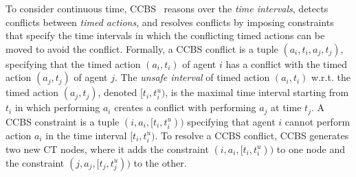 \documentclass[letterpaper]{article} %
\newcommand{\ccbs}{\ac{CCBS}\xspace}
\newcommand{\ct}{\ac{CT}\xspace}
\begin{document}
To consider continuous time, \ccbs~\cite{andreychuk2019multi} reasons over the \emph{time intervals}, 
detects conflicts between \emph{timed actions}, 
and resolves conflicts by imposing constraints that specify the time intervals in which the conflicting timed actions can be moved to avoid the conflict.  
Formally, a \ccbs conflict is a tuple $(a_i, t_i, a_j, t_j)$, specifying that the timed action $(a_i, t_i)$ of agent $i$ has a conflict with the timed action $(a_j, t_j)$ of agent $j$.  
The \emph{unsafe interval} of timed action $(a_i, t_i)$ w.r.t. the timed action $(a_j, t_j)$, denoted $[t_i, t_i^u)$, is the maximal time interval starting from $t_i$ in which performing $a_i$ creates a conflict with performing $a_j$ at time $t_j$.
A \ccbs constraint is a tuple $(i, a_i, [t_i, t_i^u))$ specifying that agent $i$ cannot perform action $a_i$ in the time interval $[t_i, t_i^u)$. 
To resolve a \ccbs conflict, \ccbs generates two new \ct nodes, 
where it adds the constraint $(i, a_i, [t_i, t_i^u))$ to one node 
and the constraint $(j, a_j, [t_j, t_j^u))$ to the other. 





\end{document}
